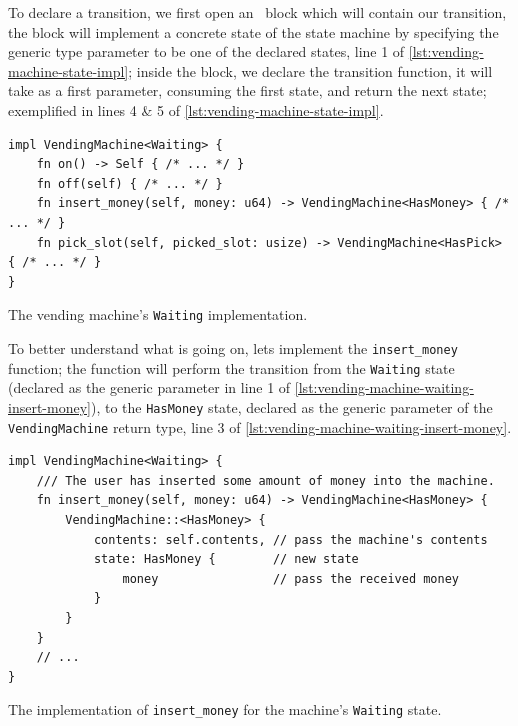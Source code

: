 To declare a transition, we first open an \footnotemark~block which will contain our transition,
the block will implement a concrete state of the state machine by specifying the generic type parameter to be one of the declared states, line 1 of \autoref{lst:vending-machine-state-impl};
inside the block, we declare the transition function, it will take  as a first parameter, consuming the first state, and return the next state;
exemplified in lines 4 \& 5 of \autoref{lst:vending-machine-state-impl}.

\begin{listing}
    \begin{verbatim}
impl VendingMachine<Waiting> {
    fn on() -> Self { /* ... */ }
    fn off(self) { /* ... */ }
    fn insert_money(self, money: u64) -> VendingMachine<HasMoney> { /* ... */ }
    fn pick_slot(self, picked_slot: usize) -> VendingMachine<HasPick> { /* ... */ }
}
\end{verbatim}
    \caption[test]{The vending machine's \texttt{Waiting} implementation\footnotemark.} %
    \label{lst:vending-machine-state-impl}
\end{listing}

To better understand what is going on, lets implement the \texttt{insert\_money} function;
the function will perform the transition from the \texttt{Waiting} state (declared as the generic parameter in line 1 of \autoref{lst:vending-machine-waiting-insert-money}),
to the \texttt{HasMoney} state, declared as the generic parameter of the \texttt{VendingMachine} return type, line 3 of \autoref{lst:vending-machine-waiting-insert-money}.

\begin{listing}
    \begin{verbatim}
impl VendingMachine<Waiting> {
    /// The user has inserted some amount of money into the machine.
    fn insert_money(self, money: u64) -> VendingMachine<HasMoney> {
        VendingMachine::<HasMoney> {
            contents: self.contents, // pass the machine's contents
            state: HasMoney {        // new state
                money                // pass the received money
            }
        }
    }
    // ...
}
\end{verbatim}
    \caption{The implementation of \texttt{insert\_money} for the machine's \texttt{Waiting} state.}
    \label{lst:vending-machine-waiting-insert-money}
\end{listing}

